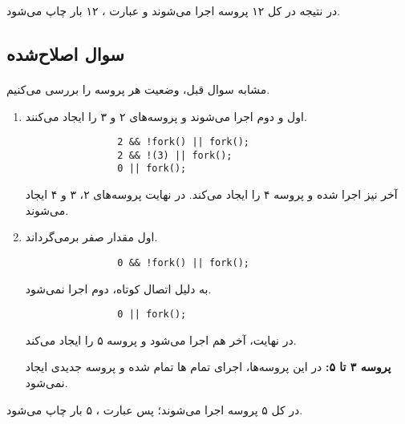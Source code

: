 \documentclass{article}
\begin{document}
	در نتیجه در کل ۱۲ پروسه اجرا می‌شوند و عبارت
	،
	۱۲ بار چاپ می‌شود.

	\subsection*{سوال اصلاح‌شده}
	\paragraph*{}
	مشابه سوال قبل، وضعیت هر پروسه را بررسی می‌کنیم.

	\begin{enumerate}[label=\textbf{پروسه \arabic*}:, leftmargin=6em]
		\item
		اول و دوم اجرا می‌شوند و پروسه‌های ۲ و ۳ را ایجاد می‌کنند.

		\begin{latin}
			\begin{verbatim}
				2 && !fork() || fork();
				2 && !(3) || fork();
				0 || fork();
			\end{verbatim}
		\end{latin}

		آخر نیز اجرا شده و پروسه ۴ را ایجاد می‌کند. در نهایت پروسه‌های ۲، ۳ و ۴ ایجاد می‌شوند.

		\item
		اول مقدار صفر برمی‌گرداند.

		\begin{latin}
			\begin{verbatim}
				0 && !fork() || fork();
			\end{verbatim}
		\end{latin}

		به دلیل اتصال کوتاه،
		دوم اجرا نمی‌شود.

		\begin{latin}
			\begin{verbatim}
				0 || fork();
			\end{verbatim}
		\end{latin}

		در نهایت،
		آخر هم اجرا می‌شود و پروسه ۵ را ایجاد می‌کند.

		\item[\textbf{پروسه ۳ تا ۵:}]
		در این پروسه‌ها، اجرای تمام
		‌ها
		تمام شده و پروسه جدیدی ایجاد نمی‌شود.
	\end{enumerate}

	در کل ۵ پروسه اجرا می‌شوند؛ پس عبارت
	،
	۵ بار چاپ می‌شود.
\end{document}
